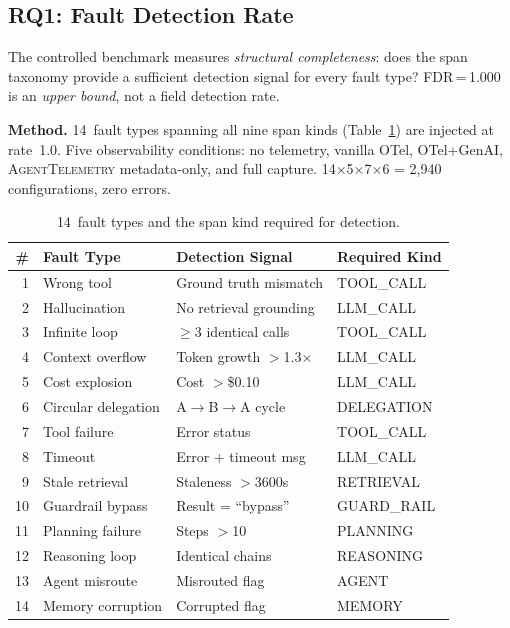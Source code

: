 \documentclass{article}
\begin{document}
\subsection{RQ1: Fault Detection Rate}
\label{sec:rq1}

The controlled benchmark measures \emph{structural completeness}:
does the span taxonomy provide a sufficient detection signal for
every fault type?  FDR\,=\,1.000 is an \emph{upper bound}, not a
field detection rate.

\textbf{Method.}  14~fault types spanning all nine span kinds
(Table~\ref{tab:faults}) are injected at rate~1.0.  Five observability
conditions: no telemetry, vanilla OTel, OTel+GenAI,
\textsc{AgentTelemetry} metadata-only, and full capture.
14$\times$5$\times$7$\times$6 = 2,940 configurations, zero errors.

\begin{table}[t]
\centering
\small
\caption{14~fault types and the span kind required for detection.}
\label{tab:faults}
\begin{tabular}{@{}rlll@{}}
\toprule
\textbf{\#} & \textbf{Fault Type} & \textbf{Detection Signal} & \textbf{Required Kind} \\
\midrule
1  & Wrong tool          & Ground truth mismatch  & TOOL\_CALL \\
2  & Hallucination       & No retrieval grounding & LLM\_CALL \\
3  & Infinite loop       & $\geq$3 identical calls & TOOL\_CALL \\
4  & Context overflow    & Token growth $>$1.3$\times$ & LLM\_CALL \\
5  & Cost explosion      & Cost $>$\$0.10        & LLM\_CALL \\
6  & Circular delegation & A$\to$B$\to$A cycle    & DELEGATION \\
7  & Tool failure        & Error status           & TOOL\_CALL \\
8  & Timeout             & Error + timeout msg    & LLM\_CALL \\
9  & Stale retrieval     & Staleness $>$3600s     & RETRIEVAL \\
10 & Guardrail bypass    & Result = ``bypass''    & GUARD\_RAIL \\
11 & Planning failure    & Steps $>$10            & PLANNING \\
12 & Reasoning loop      & Identical chains       & REASONING \\
13 & Agent misroute      & Misrouted flag         & AGENT \\
14 & Memory corruption   & Corrupted flag         & MEMORY \\
\bottomrule
\end{tabular}
\end{table}
\end{document}
